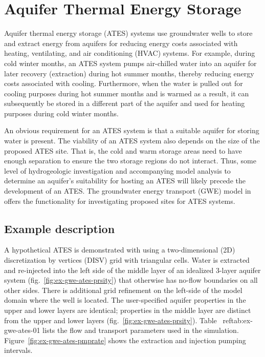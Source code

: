 \section{Aquifer Thermal Energy Storage}

Aquifer thermal energy storage (ATES) systems use groundwater wells to store and extract energy from aquifers for reducing energy costs associated with heating, ventilating, and air conditioning (HVAC) systems.  For example, during cold winter months, an ATES system pumps air-chilled water into an aquifer for later recovery (extraction) during hot summer months, thereby reducing energy costs associated with cooling. Furthermore, when the water is pulled out for cooling purposes during hot summer months and is warmed as a result, it can subsequently be stored in a different part of the aquifer and used for heating purposes during cold winter months.  



An obvious requirement for an ATES system is that a suitable aquifer for storing water is present.  The viability of an ATES system also depends on the size of the proposed ATES site. That is, the cold and warm storage areas need to have enough separation to ensure the two storage regions do not interact. Thus, some level of hydrogeologic investigation and accompanying model analysis to determine an aquifer's suitability for hosting an ATES will likely precede the development of an ATES. The groundwater energy transport (GWE) model in \mf offers the functionality for investigating proposed sites for ATES systems.

\subsection{Example description}

A hypothetical ATES is demonstrated with \mf using a two-dimensional (2D) discretization by vertices (DISV) grid with triangular cells.  Water is extracted and re-injected into the left side of the middle layer of an idealized 3-layer aquifer system (fig.~\ref{fig:ex-gwe-ates-prsity}) that otherwise has no-flow boundaries on all other sides.  There is additional grid refinement on the left-side of the model domain where the well is located.  The user-specified aquifer properties in the upper and lower layers are identical; properties in the middle layer are distinct from the upper and lower layers (fig.~\ref{fig:ex-gwe-ates-prsity}).  Table ~ref{tab:ex-gwe-ates-01} lists the flow and transport parameters used in the simulation.  Figure~\ref{fig:ex-gwe-ates-pmprate} shows the extraction and injection pumping intervals.

